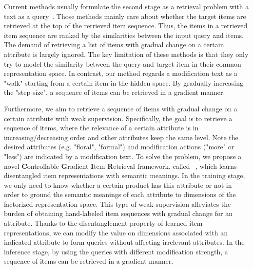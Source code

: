 Current methods usually formulate the second stage as a retrieval problem with a text as a query~\cite{Zhen19DSCMR, Vo19TIRG}. Those methods mainly care about whether the target items are retrieved at the top of the retrieved item sequence. Thus, the items in a retrieved item sequence are ranked by the similarities between the input query and items. The demand of retrieving a list of items with gradual change on a certain attribute is largely ignored. The key limitation of these methods is that they only try to model the similarity between the query and target item in their common representation space. In contrast, our method regards a modification text as a "walk" starting from a certain item in the hidden space. By gradually increasing the "step size", a sequence of items can be retrieved in a gradient manner. 

Furthermore, we aim to retrieve a sequence of items with gradual change on a certain attribute with weak supervision.
Specifically, the goal is to retrieve a sequence of items, where the relevance of a certain attribute is in increasing/decreasing order and other attributes keep the same level. Note the desired attributes (e.g. "floral", "formal") and modification actions ("more" or "less") are indicated by a modification text. To solve the problem, we propose a novel \textbf{C}ontrollable \textbf{G}radient \textbf{I}tem \textbf{R}etrieval framework, called \CGIR~, which learns disentangled item representations with semantic meanings. In the training stage, we only need to know whether a certain product has this attribute or not in order to ground the semantic meanings of each attribute to dimensions of the factorized representation space. This type of weak supervision alleviates the burden of obtaining hand-labeled item sequences with gradual change for an attribute. Thanks to the disentanglement property of learned item representations, we can modify the value on dimensions associated with an indicated attribute to form queries without affecting irrelevant attributes. In the inference stage, by using the queries with different modification strength, a sequence of items can be retrieved in a gradient manner.


